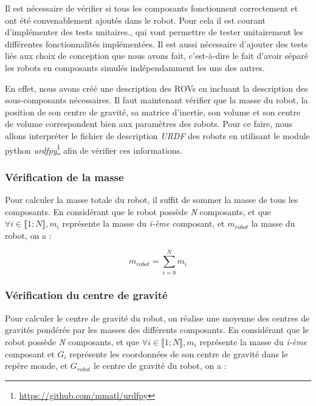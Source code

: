 			Il est nécessaire de vérifier si tous les composants fonctionnent correctement et ont été convenablement ajoutés dans le robot. Pour cela il est courant d'implémenter des tests unitaires., qui vont permettre de tester unitairement les différentes fonctionnalités implémentées. Il est aussi nécessaire d'ajouter des tests liés aux choix de conception que nous avons fait, c’est-à-dire le fait d'avoir séparé les robots en composants simulés indépendamment les uns des autres.

			En effet, nous avons créé une description des \gls{ROV}s en incluant la description des sous-composants nécessaires. Il faut maintenant vérifier que la masse du robot, la position de son centre de gravité, sa matrice d'inertie, son volume et son centre de volume correspondent bien aux paramètres des robots. Pour ce faire, nous allons interpréter le fichier de description \textit{URDF} des robots en utilisant le module python \textit{urdfpy}\footnote{\url{https://github.com/mmatl/urdfpy}} afin de vérifier ces informations.

			\subsubsection{Vérification de la masse}

				Pour calculer la masse totale du robot, il suffit de sommer la masse de tous les composants. En considérant que le robot possède \textit{N} composants, et que $\forall i \in \llbracket 1; N \rrbracket, m_i$ représente la masse du \textit{i-ème} composant, et $m_{robot}$ la masse du robot, on a :

				\begin{equation}
					m_{robot} = \sum_{i=0}^{N}m_i
				\end{equation}

			\subsubsection{Vérification du centre de gravité}

				Pour calculer le centre de gravité du robot, on réalise une moyenne des centres de gravités pondérée par les masses des différents composants. En considérant que le robot possède \textit{N} composants, et que $\forall i \in \llbracket 1; N \rrbracket, m_i$ représente la masse du \textit{i-ème} composant et $G_i$ représente les coordonnées de son centre de gravité dans le repère monde, et $G_{robot}$ le centre de gravité du robot, on a :

